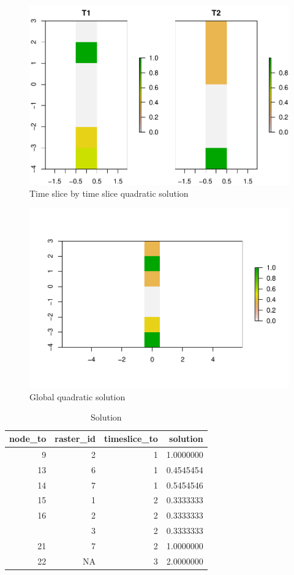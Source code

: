 \documentclass[]{article}
\begin{document}
\begin{figure}
\centering
\includegraphics{Ideas2_files/figure-latex/unnamed-chunk-23-1.pdf}
\caption{\label{fig:unnamed-chunk-23}Time slice by time slice quadratic solution}
\end{figure}

\begin{figure}
\centering
\includegraphics{Ideas2_files/figure-latex/unnamed-chunk-24-1.pdf}
\caption{\label{fig:unnamed-chunk-24}Global quadratic solution}
\end{figure}

\begin{table}[!h]

\caption{\label{tab:SolutionQuad}Solution}
\centering
\begin{tabular}[t]{rrrr}
\toprule
node\_to & raster\_id & timeslice\_to & solution\\
\midrule
\rowcolor{gray!6}  9 & 2 & 1 & 1.0000000\\
13 & 6 & 1 & 0.4545454\\
\rowcolor{gray!6}  14 & 7 & 1 & 0.5454546\\
15 & 1 & 2 & 0.3333333\\
\rowcolor{gray!6}  16 & 2 & 2 & 0.3333333\\
\addlinespace
17 & 3 & 2 & 0.3333333\\
\rowcolor{gray!6}  21 & 7 & 2 & 1.0000000\\
22 & NA & 3 & 2.0000000\\
\bottomrule
\end{tabular}
\end{table}
\end{document}
